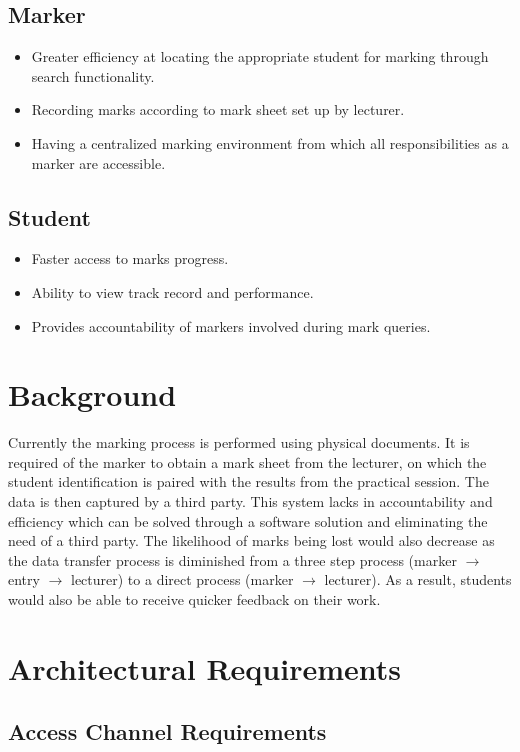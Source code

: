 \documentclass[a4paper]{article}
\begin{document}
\subsection{Marker}
\begin{itemize}
\item	Greater efficiency at locating the appropriate student for marking through search functionality.
\item	Recording marks according to mark sheet set up by lecturer.
\item	Having a centralized marking environment from which all responsibilities as a marker are accessible.
\end{itemize}

\subsection{Student}
\begin{itemize}
\item	Faster access to marks progress.
\item	Ability to view track record and performance.
\item	Provides accountability of markers involved during mark queries.
\end{itemize}


\section{Background}
Currently the marking process is performed using physical documents. It is required of the marker to obtain a mark sheet from the lecturer, on which the student identification is paired with the results from the practical session. The data is then captured by a third party. This system lacks in accountability and efficiency which can be solved through a software solution and eliminating the need of a third party. The likelihood of marks being lost would also decrease as the data transfer process is diminished from a three step process (marker $\rightarrow$ entry $\rightarrow$ lecturer) to a direct process (marker $\rightarrow$ lecturer). As a result, students would also be able to receive quicker feedback on their work.

\section{Architectural Requirements}

\subsection{Access Channel Requirements}
\end{document}
